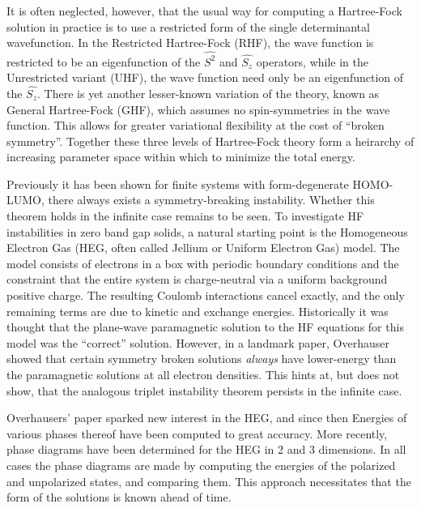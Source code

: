 \documentclass[preprint, journal=prl]{revtex4-1}
\begin{document}
  It is often neglected, however, that the usual way for computing a Hartree-Fock solution in practice is to use a restricted form of the single determinantal wavefunction. In the Restricted  Hartree-Fock (RHF), the wave function is restricted to be an eigenfunction of the $\hat{S^2}$ and $\hat{S_z}$ operators, while in the Unrestricted variant (UHF), the wave function need only be an eigenfunction of the $\hat{S_z}$. There is yet another lesser-known variation of the theory, known as General Hartree-Fock (GHF), which assumes no spin-symmetries in the wave function. This allows for greater variational flexibility at the cost of ``broken symmetry''. Together these three levels of Hartree-Fock theory form a heirarchy of increasing parameter space within which to minimize the total energy. 
    
  Previously it has been shown for finite systems with form-degenerate HOMO-LUMO, there always exists a symmetry-breaking instability\cite{Yamada2015}. Whether this theorem holds in the infinite case remains to be seen. To investigate HF instabilities in zero band gap solids, a natural starting point is the Homogeneous Electron Gas (HEG, often called Jellium or Uniform Electron Gas) model. The model consists of electrons in a box with periodic boundary conditions  and the constraint that the entire system is charge-neutral via a uniform background positive  charge. The resulting Coulomb interactions cancel exactly, and the only remaining terms are due   to kinetic and exchange energies. Historically it was thought that the plane-wave paramagnetic solution to the HF equations for this model was the ``correct'' solution. However, in a landmark paper, Overhauser showed that certain symmetry broken solutions \emph{always} have lower-energy than the paramagnetic solutions at all electron densities\cite{Overhauser1962}. This hints at, but does not show, that the analogous triplet instability theorem persists in the infinite case.  
        
  Overhausers' paper sparked new interest in the HEG, and since then Energies of various phases thereof have been computed to great accuracy\cite{Ceperley1980}. More recently, phase diagrams have been determined for the HEG in 2 and 3 dimensions\cite{Delyon2008, Bernu2011, Baguet2013}. In all cases the phase diagrams are made by computing the energies of the polarized and unpolarized states, and comparing them. This approach necessitates that the form of the solutions is known ahead of time. 
  
\end{document}
